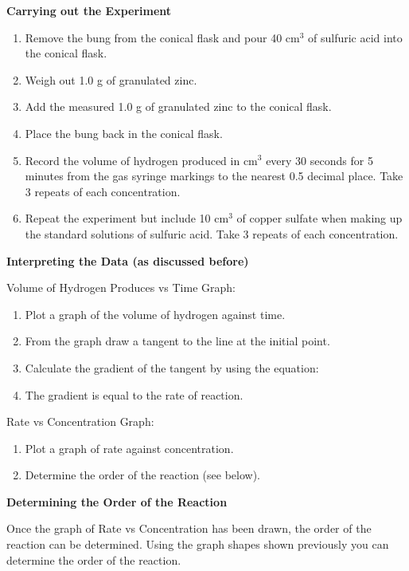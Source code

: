 \textbf{Carrying out the Experiment}

\begin{enumerate}
\item Remove the bung from the conical flask and pour 40 cm$^3$ of sulfuric acid into the conical flask.
\item Weigh out 1.0 g of granulated zinc.
\item Add the measured 1.0 g of granulated zinc to the conical flask.
\item Place the bung back in the conical flask.
\item Record the volume of hydrogen produced in cm$^3$ every 30 seconds for 5 minutes from the gas syringe markings to the nearest 0.5 decimal place. Take 3 repeats of each concentration.
\item Repeat the experiment but include 10 cm$^3$ of copper sulfate when making up the standard solutions of sulfuric acid. Take 3 repeats of each concentration.
\end{enumerate} 

\textbf{Interpreting the Data (as discussed before)}

Volume of Hydrogen Produces vs Time Graph:
\begin{enumerate}
\item Plot a graph of the volume of hydrogen against time.
\item From the graph draw a tangent to the line at the initial point.
\item Calculate the gradient of the tangent by using the equation: 
\item The gradient is equal to the rate of reaction.
\end{enumerate}

Rate vs Concentration Graph:
\begin{enumerate}
\item Plot a graph of rate against concentration.
\item Determine the order of the reaction (see below).
\end{enumerate}








\textbf{Determining the Order of the Reaction}

Once the graph of Rate vs Concentration has been drawn, the order of the reaction can be determined. Using the graph shapes shown previously you can determine the order of the reaction.

